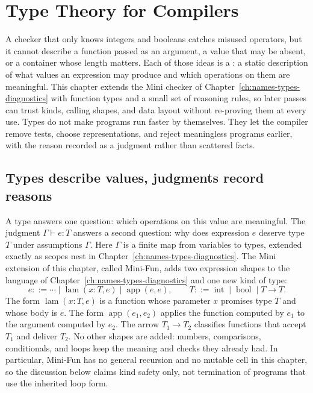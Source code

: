 \chapter{Type Theory for Compilers}
\label{ch:type-theory-compilers}

A checker that only knows integers and booleans catches misused operators, but it cannot describe a function passed as an argument, a value that may be absent, or a container whose length matters.
Each of those ideas is a : a static description of what values an expression may produce and which operations on them are meaningful.
This chapter extends the Mini checker of Chapter~\ref{ch:names-types-diagnostics} with function types and a small set of reasoning rules, so later passes can trust kinds, calling shapes, and data layout without re-proving them at every use.
Types do not make programs run faster by themselves.
They let the compiler remove tests, choose representations, and reject meaningless programs earlier, with the reason recorded as a judgment rather than scattered facts.

\section{Types describe values, judgments record reasons}
\label{sec:ch39-judgments}

A type answers one question: which operations on this value are meaningful.
The judgment $\Gamma \vdash e : T$ answers a second question: why does expression $e$ deserve type $T$ under assumptions $\Gamma$.
Here $\Gamma$ is a finite map from variables to types, extended exactly as scopes nest in Chapter~\ref{ch:names-types-diagnostics}.
The Mini extension of this chapter, called Mini-Fun, adds two expression shapes to the language of Chapter~\ref{ch:names-types-diagnostics} and one new kind of type:
\begin{equation}
  e ::= \cdots \mid \operatorname{lam}(x : T, e) \mid \operatorname{app}(e, e),
  \qquad
  T ::= \operatorname{int} \mid \operatorname{bool} \mid T \to T.
  \label{eq:ch39-syntax}
\end{equation}
The form $\operatorname{lam}(x : T, e)$ is a function whose parameter $x$ promises type $T$ and whose body is $e$.
The form $\operatorname{app}(e_1, e_2)$ applies the function computed by $e_1$ to the argument computed by $e_2$.
The arrow $T_1 \to T_2$ classifies functions that accept $T_1$ and deliver $T_2$.
No other shapes are added: numbers, comparisons, conditionals, and loops keep the meaning and checks they already had.
In particular, Mini-Fun has no general recursion and no mutable cell in this chapter, so the discussion below claims kind safety only, not termination of programs that use the inherited loop form.

